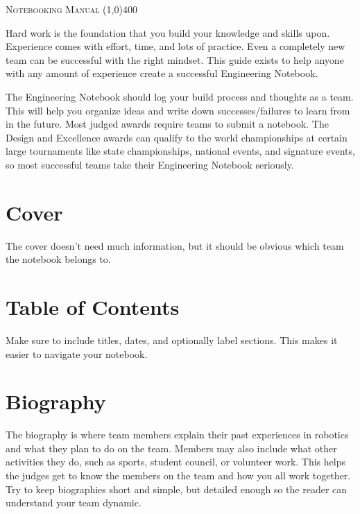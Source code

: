 \documentclass[letterpaper, 12pt]{article}
\begin{document}
\begin{center}
\huge\textsc{Notebooking Manual}
\line(1,0){400}

\vspace{0.1in}

\end{center}

Hard work is the foundation that you build your knowledge and skills upon. Experience comes with effort, time, and lots of practice. Even a completely new team can be successful with the right mindset. This guide exists to help anyone with any amount of experience create a successful Engineering Notebook.

The Engineering Notebook should log your build process and thoughts as a team. This will help you organize ideas and write down successes/failures to learn from in the future. Most judged awards require teams to submit a notebook. The Design and Excellence awards can qualify to the world championships at certain large tournaments like state championships, national events, and signature events, so most successful teams take their Engineering Notebook seriously.

\section*{Cover}

The cover doesn’t need much information, but it should be obvious which team the notebook belongs to.

\section*{Table of Contents}

Make sure to include titles, dates, and optionally label sections. This makes it easier to navigate your notebook.

\section*{Biography}

The biography is where team members explain their past experiences in robotics and what they plan to do on the team. Members may also include what other activities they do, such as sports, student council, or volunteer work. This helps the judges get to know the members on the team and how you all work together. Try to keep biographies short and simple, but detailed enough so the reader can understand your team dynamic.
\end{document}
